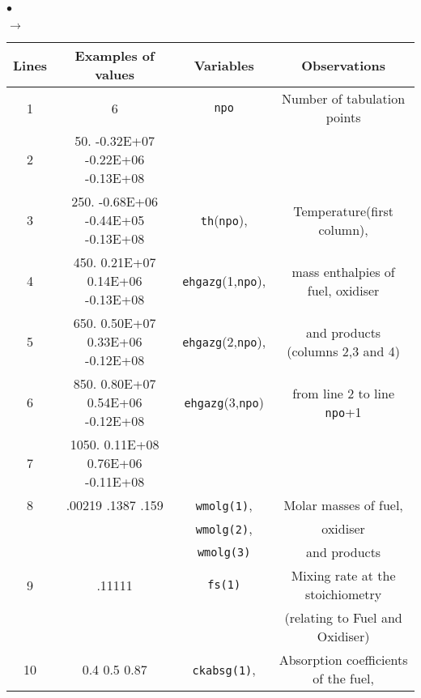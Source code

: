 {{{\begin{list}{$\bullet$}{}
\begin{list}{$\rightarrow$}{}
\begin{table}[htbp]
\begin{center}
\small{
\begin{tabular}{|c|c|c|c|} \hline
 Lines  &            Examples of values     &        Variables            & Observations                                \\ \hline
   1    &                    6              &   \texttt{npo}              & Number of tabulation points                 \\ \hline
   2    &  50. -0.32E+07 -0.22E+06 -0.13E+08&                             &                                             \\
   3    & 250. -0.68E+06 -0.44E+05 -0.13E+08&\texttt{th\index{th}}(\texttt{npo}),           & Temperature(first column),                  \\
   4    & 450.  0.21E+07  0.14E+06 -0.13E+08& \texttt{ehgazg\index{ehgazg}}(1,\texttt{npo}),& mass enthalpies of fuel, oxidiser             \\
   5    & 650.  0.50E+07  0.33E+06 -0.12E+08& \texttt{ehgazg}(2,\texttt{npo}),              & and products (columns 2,3 and 4)            \\
   6    & 850.  0.80E+07  0.54E+06 -0.12E+08& \texttt{ehgazg}(3,\texttt{npo})               & from line 2 to line \texttt{npo}+1                   \\
   7    &1050.  0.11E+08  0.76E+06 -0.11E+08&                             &                                             \\ \hline
   8    & .00219       .1387        .159    &\texttt{wmolg(1)\index{wmolg}},       & Molar masses of fuel,                         \\
        &                                   &                    \texttt{wmolg(2)},& oxidiser                                    \\
        &                                   &                    \texttt{wmolg(3)} & and products                                \\ \hline
   9    &                .11111             &          \texttt{fs(1)\index{fs(1)}} & Mixing rate at the stoichiometry            \\
        &                                   &                             & (relating to Fuel and Oxidiser)             \\ \hline
  10    &    0.4      0.5       0.87        &\texttt{ckabsg\index{ckabsg}(1)},     & Absorption coefficients of the fuel,             \\

\end{tabular}}
\end{center}
\end{table}
\end{list}
\end{list}}}}
